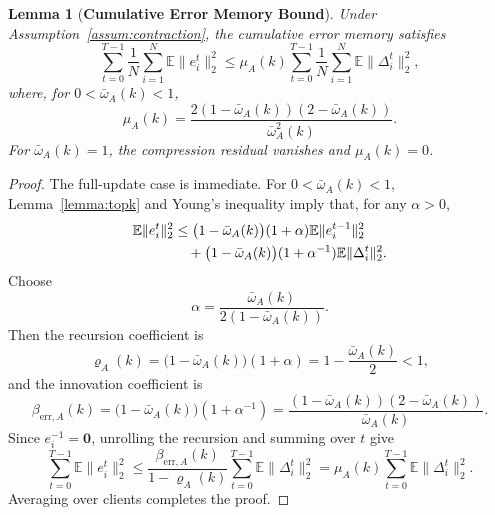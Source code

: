 \documentclass[conference]{IEEEtran}
\newtheorem{lemma}{Lemma}
\begin{document}
\begin{lemma}[\bf Cumulative Error Memory Bound]
    \label{lemma:error_bound}
    Under Assumption~\ref{assum:contraction}, the cumulative error memory satisfies
    \begin{equation}
        \sum_{t=0}^{T-1}\frac1N\sum_{i=1}^{N}\mathbb{E}\|e_i^t\|_2^2
        \le
        \mu_A(k)
        \sum_{t=0}^{T-1}\frac1N\sum_{i=1}^{N}\mathbb{E}\|\Delta_i^t\|_2^2,
    \end{equation}
    where, for $0<\bar{\omega}_A(k)<1$,
    \begin{equation}
        \label{eqn:mu_def}
        \mu_A(k)
        =\frac{2(1-\bar{\omega}_A(k))(2-\bar{\omega}_A(k))}{\bar{\omega}_A^2(k)}.
    \end{equation}
    For $\bar{\omega}_A(k)=1$, the compression residual vanishes and $\mu_A(k)=0$.
\end{lemma}
\begin{proof}
    The full-update case is immediate. For $0<\bar{\omega}_A(k)<1$, Lemma~\ref{lemma:topk} and Young's inequality imply that, for any $\alpha>0$,
    \begin{align}
        \mathbb{E}\|e_i^t\|_2^2
        &\le
        \big(1-\bar{\omega}_A(k)\big)(1+\alpha)\mathbb{E}\|e_i^{t-1}\|_2^2
        \notag\\
        &\quad+
        \big(1-\bar{\omega}_A(k)\big)(1+\alpha^{-1})\mathbb{E}\|\Delta_i^t\|_2^2.
    \end{align}
    Choose
    \begin{equation}
        \alpha=\frac{\bar{\omega}_A(k)}{2(1-\bar{\omega}_A(k))}.
    \end{equation}
    Then the recursion coefficient is
    \begin{equation}
        \varrho_A(k)
        =\big(1-\bar{\omega}_A(k)\big)(1+\alpha)
        =1-\frac{\bar{\omega}_A(k)}{2}<1,
    \end{equation}
    and the innovation coefficient is
    \begin{equation}
        \beta_{\mathrm{err},A}(k)
        =\big(1-\bar{\omega}_A(k)\big)(1+\alpha^{-1})
        =\frac{(1-\bar{\omega}_A(k))(2-\bar{\omega}_A(k))}{\bar{\omega}_A(k)}.
    \end{equation}
    Since $e_i^{-1}=\mathbf{0}$, unrolling the recursion and summing over $t$ give
    \begin{equation}
        \sum_{t=0}^{T-1}\mathbb{E}\|e_i^t\|_2^2
        \le
        \frac{\beta_{\mathrm{err},A}(k)}{1-\varrho_A(k)}
        \sum_{t=0}^{T-1}\mathbb{E}\|\Delta_i^t\|_2^2
        =\mu_A(k)\sum_{t=0}^{T-1}\mathbb{E}\|\Delta_i^t\|_2^2.
    \end{equation}
    Averaging over clients completes the proof.
\end{proof}
\end{document}
